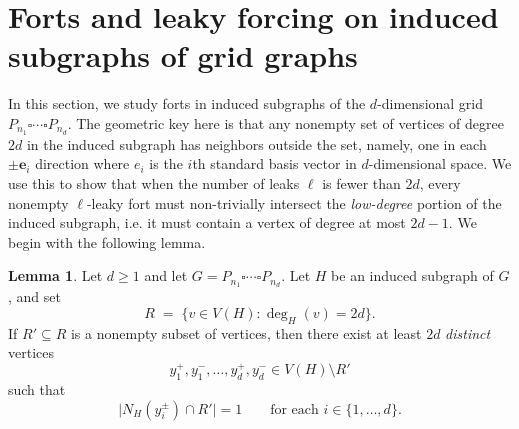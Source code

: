 \documentclass[11pt]{article}
\theoremstyle{plain} \newtheorem{question}{Question}
\theoremstyle{definition}
\newtheorem{lem}[thm]{Lemma}
\begin{document}
\begin{figure}[h!]
    \caption{}
    \label{fig:LeakyForts}
\end{figure}




\section{Forts and leaky forcing on induced subgraphs of grid graphs}\label{sec:FortsInducedSubgraphs}
In this section, we study forts in induced subgraphs of the $d$-dimensional grid $P_{n_1}\square\cdots\square P_{n_d}$. The geometric key here is that any nonempty set of vertices of degree $2d$ in the induced subgraph has neighbors outside the set, namely, one in each $\pm\mathbf e_i$ direction where $e_i$ is the $i$th standard basis vector in $d$-dimensional space. We use this to show that when the number of leaks $\ell$ is fewer than $2d$, every nonempty $\ell$-leaky fort must non-trivially intersect the \emph{low-degree} portion of the induced subgraph, i.e. it must contain a vertex of degree at most $2d-1$. We begin with the following lemma.

\begin{lem}\label{lem:2d-exposed-neighbors}
Let $d\ge 1$ and let $G = P_{n_1}\square \cdots \square P_{n_d}$. Let $H$ be an induced subgraph of $G$, and set
\[
R \;=\; \{v\in V(H): \deg_H(v)=2d\}.
\]
If $R'\subseteq R$ is a nonempty subset of vertices, then there exist at least $2d$ \emph{distinct} vertices
\[
y_1^+,y_1^-,\dots,y_d^+,y_d^- \in V(H)\setminus R'
\]
such that
\[
\bigl|N_H(y_i^\pm)\cap R'\bigr|=1 \qquad \text{for each } i\in\{1,\dots,d\}.
\]
\end{lem}
\end{document}
